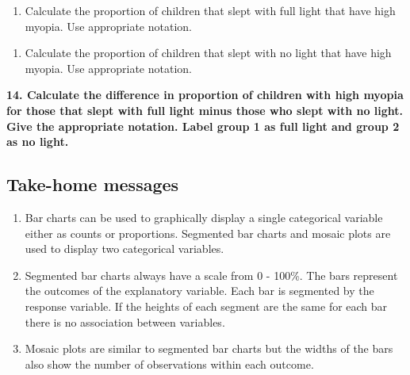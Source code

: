 \documentclass[
]{report}
\providecommand{\tightlist}{%
  \setlength{\itemsep}{0pt}\setlength{\parskip}{0pt}}
\begin{document}
\begin{enumerate}
\def\labelenumi{\arabic{enumi}.}
\setcounter{enumi}{11}
\tightlist
\item
  Calculate the proportion of children that slept with full light that have high myopia. Use appropriate notation.
\end{enumerate}

\vspace{0.3in}

\begin{enumerate}
\def\labelenumi{\arabic{enumi}.}
\setcounter{enumi}{12}
\tightlist
\item
  Calculate the proportion of children that slept with no light that have high myopia. Use appropriate notation.
\end{enumerate}

\vspace{0.3in}

\textbf{14. Calculate the difference in proportion of children with high myopia for those that slept with full light minus those who slept with no light. Give the appropriate notation. Label group 1 as full light and group 2 as no light.}

\vspace{0.3in}

\hypertarget{take-home-messages-4}{%
\subsection{Take-home messages}\label{take-home-messages-4}}

\begin{enumerate}
\def\labelenumi{\arabic{enumi}.}
\item
  Bar charts can be used to graphically display a single categorical variable either as counts or proportions. Segmented bar charts and mosaic plots are used to display two categorical variables.
\item
  Segmented bar charts always have a scale from 0 - 100\%. The bars represent the outcomes of the explanatory variable. Each bar is segmented by the response variable. If the heights of each segment are the same for each bar there is no association between variables.
\item
  Mosaic plots are similar to segmented bar charts but the widths of the bars also show the number of observations within each outcome.
\end{enumerate}

\newpage
\end{document}
